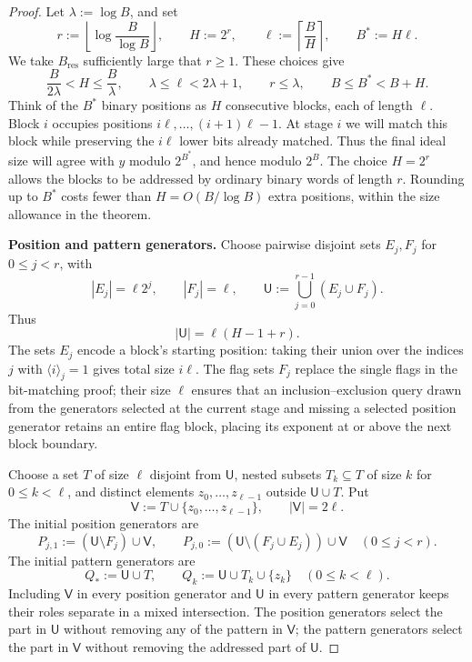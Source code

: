 \documentclass[11pt]{article}
\theoremstyle{definition}
\theoremstyle{remark}
\begin{document}
\begin{proof}
Let $\lambda:=\log B$, and set
\begin{equation}
  r:=\left\lfloor\log\frac{B}{\log B}\right\rfloor,
  \qquad H:=2^r,
  \qquad \ell:=\left\lceil\frac{B}{H}\right\rceil,
  \qquad B^*:=H\ell.
  \label{eq:block-parameters}
\end{equation}
We take $B_{\mathrm{res}}$ sufficiently large that $r\ge1$.  These choices give
\begin{equation}
  \frac{B}{2\lambda}<H\le\frac{B}{\lambda},
  \qquad \lambda\le\ell<2\lambda+1,
  \qquad r\le \lambda,
  \qquad B\le B^*<B+H.
  \label{eq:block-parameter-bounds}
\end{equation}
Think of the $B^*$ binary positions as $H$ consecutive blocks, each of
length $\ell$.  Block $i$ occupies positions $i\ell,\ldots,(i+1)\ell-1$.
At stage $i$ we will match this block while preserving the $i\ell$ lower
bits already matched.  Thus the final ideal size will agree with $y$
modulo $2^{B^*}$, and hence modulo $2^B$.  The choice $H=2^r$ allows the
blocks to be addressed by ordinary binary words of length $r$.  Rounding
up to $B^*$ costs fewer than $H=O(B/\log B)$ extra positions, within the
size allowance in the theorem.

\smallskip
\noindent\textbf{Position and pattern generators.}
Choose pairwise disjoint sets $E_j,F_j$ for $0\le j<r$, with
\[
  |E_j|=\ell2^j,
  \qquad |F_j|=\ell,
  \qquad
  \mathsf U:=\bigcup_{j=0}^{r-1}(E_j\cup F_j).
\]
Thus
\[
  |\mathsf U|=\ell(H-1+r).
\]
The sets $E_j$ encode a block's starting position: taking their union over
the indices $j$ with $\langle i\rangle_j=1$ gives total size $i\ell$.
The flag sets $F_j$ replace the single flags in the bit-matching proof;
their size $\ell$ ensures that an inclusion--exclusion query drawn from
the generators selected at the current stage and missing a selected
position generator retains an entire flag block, placing its exponent at
or above the next block boundary.

Choose a set $T$ of size $\ell$ disjoint from $\mathsf U$, nested subsets
$T_k\subseteq T$ of size $k$ for $0\le k<\ell$, and distinct elements
$z_0,\ldots,z_{\ell-1}$ outside $\mathsf U\cup T$.  Put
\[
  \mathsf V:=T\cup\{z_0,\ldots,z_{\ell-1}\},
  \qquad |\mathsf V|=2\ell.
\]
The initial position generators are
\begin{equation}
  P_{j,1}:=(\mathsf U\setminus F_j)\cup\mathsf V,
  \qquad
  P_{j,0}:=(\mathsf U\setminus(F_j\cup E_j))\cup\mathsf V
  \quad(0\le j<r).
  \label{eq:position-generators}
\end{equation}
The initial pattern generators are
\begin{equation}
  Q_*:=\mathsf U\cup T,
  \qquad
  Q_k:=\mathsf U\cup T_k\cup\{z_k\}
  \quad(0\le k<\ell).
  \label{eq:pattern-generators}
\end{equation}
Including $\mathsf V$ in every position generator and $\mathsf U$ in
every pattern generator keeps their roles separate in a mixed
intersection.  The position generators select the part in $\mathsf U$
without removing any of the pattern in $\mathsf V$; the pattern generators
select the part in $\mathsf V$ without removing the addressed part of
$\mathsf U$.


\end{proof}
\end{document}
